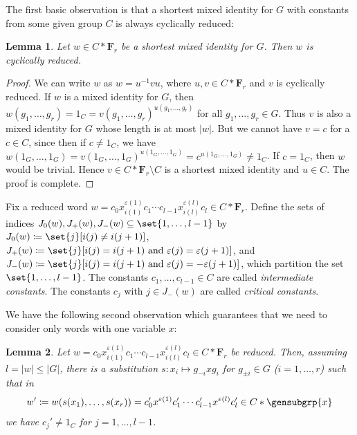 \documentclass[a4paper,11pt]{amsproc}
\newcommand{\norm}[1]{\lvert#1\rvert}%
\newcommand{\card}[1]{\left\lvert#1\right\rvert}%
\newcommand{\freegrp}{\mathbf F}%
\theoremstyle{plain}
\newtheorem{lemma}{Lemma}[section]
\theoremstyle{definition}
\begin{document}
	The first basic observation is that a shortest mixed identity for $G$ with constants from some given group $C$ is always cyclically reduced:
	
	\begin{lemma}\label{lem:shrt_id_cyc_red}
		Let $w\in C\ast\freegrp_r$ be a shortest mixed identity for $G$. Then $w$ is cyclically reduced.
	\end{lemma}
	
	\begin{proof}
		We can write $w$ as $w=u^{-1}vu$, where $u,v\in C\ast\freegrp_r$ and $v$ is cyclically reduced. If $w$ is a mixed identity for $G$, then $w(g_1,\ldots,g_r)=1_C=v(g_1,\ldots,g_r)^{u(g_1,\ldots,g_r)}$ for all $g_1,\ldots,g_r\in G$. Thus $v$ is also a mixed identity for $G$ whose length is at most $\norm{w}$. But we cannot have $v=c$ for a $c\in C$, since then if $c\neq 1_C$, we have $w(1_G,\ldots,1_G)=v(1_G,\ldots,1_G)^{u(1_G,\ldots,1_G)}=c^{u(1_G,\ldots,1_G)}\neq 1_C$. If $c=1_C$, then $w$ would be trivial. Hence $v\in C\ast\freegrp_r\setminus C$ is a shortest mixed identity and $u\in C$. The proof is complete.
	\end{proof}
	
	Fix a reduced word $w=c_0 x_{i(1)}^{\varepsilon(1)} c_1 \cdots c_{l-1} x_{i(l)}^{\varepsilon(l)} c_l\in C\ast\freegrp_r$. Define the sets of indices $J_0(w),J_+(w),J_-(w)\subseteq\set{1,\ldots,l-1}$ by $J_0(w)\coloneqq\set{j}[i(j)\neq i(j+1)]$, $J_+(w)\coloneqq\set{j}[i(j)=i(j+1)\text{ and }\varepsilon(j)=\varepsilon(j+1)]$, and $J_-(w)\coloneqq\set{j}[i(j)=i(j+1)\text{ and }\varepsilon(j)=-\varepsilon(j+1)]$, which partition the set $\set{1,\ldots,l-1}$. The constants $c_1,\ldots,c_{l-1}\in C$ are called \emph{intermediate constants}. The constants $c_j$ with $j\in J_-(w)$ are called \emph{critical constants}\label{def:crit_consts}.
	
	We have the following second observation which guarantees that we need to consider only words with one variable $x$:
	
	\begin{lemma}\label{lem:red_one_var_cs}
		Let $w=c_0 x_{i(1)}^{\varepsilon(1)} c_1 \cdots c_{l-1} x_{i(l)}^{\varepsilon(l)} c_l\in C\ast\freegrp_r$ be reduced. Then, assuming $l=\norm{w}\leq\card{G}$, there is a substitution $s\colon x_i\mapsto g_{-i} x g_i$ for $g_{\pm i}\in G$ ($i=1,\ldots,r$) such that in 
		$$
		w'\coloneqq w(s(x_1),\ldots,s(x_r))=c_0' x^{\varepsilon(1)} c_1' \cdots c_{l-1}' x^{\varepsilon(l)} c_l'\in C\ast\gensubgrp{x}
		$$ 
		we have $c_j'\neq 1_C$ for $j=1,\ldots,l-1$.
	\end{lemma}
	
\end{document}
